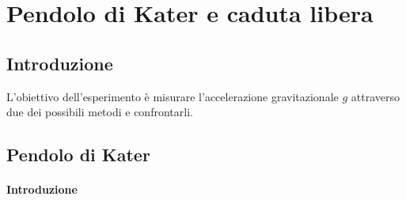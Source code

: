 \chapter{Pendolo di Kater e caduta libera}
\section{Introduzione}
L'obiettivo dell'esperimento è misurare l'accelerazione gravitazionale $g$ attraverso due dei possibili metodi e confrontarli. 

\section{Pendolo di Kater}
\subsubsection{Introduzione}
